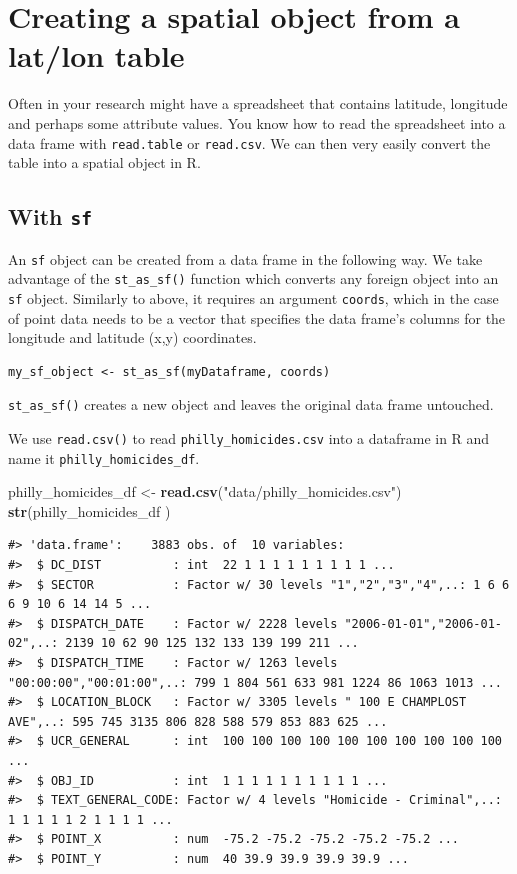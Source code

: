 \documentclass[]{book}
\newenvironment{Shaded}{\begin{snugshade}}{\end{snugshade}}
\newcommand{\KeywordTok}[1]{\textcolor[rgb]{0.13,0.29,0.53}{\textbf{#1}}}
\newcommand{\StringTok}[1]{\textcolor[rgb]{0.31,0.60,0.02}{#1}}
\newcommand{\NormalTok}[1]{#1}
\begin{document}
\section{Creating a spatial object from a lat/lon
table}\label{creating-a-spatial-object-from-a-latlon-table}

Often in your research might have a spreadsheet that contains latitude,
longitude and perhaps some attribute values. You know how to read the
spreadsheet into a data frame with \texttt{read.table} or
\texttt{read.csv}. We can then very easily convert the table into a
spatial object in R.

\subsection{\texorpdfstring{With \texttt{sf}}{With sf}}\label{with-sf}

An \texttt{sf} object can be created from a data frame in the following
way. We take advantage of the \texttt{st\_as\_sf()} function which
converts any foreign object into an \texttt{sf} object. Similarly to
above, it requires an argument \texttt{coords}, which in the case of
point data needs to be a vector that specifies the data frame's columns
for the longitude and latitude (x,y) coordinates.

\begin{verbatim}
my_sf_object <- st_as_sf(myDataframe, coords)
\end{verbatim}

\texttt{st\_as\_sf()} creates a new object and leaves the original data
frame untouched.

We use \texttt{read.csv()} to read \texttt{philly\_homicides.csv} into a
dataframe in R and name it \texttt{philly\_homicides\_df}.

\begin{Shaded}
\begin{Highlighting}[]
\NormalTok{philly_homicides_df <-}\StringTok{ }\KeywordTok{read.csv}\NormalTok{(}\StringTok{"data/philly_homicides.csv"}\NormalTok{)}
\KeywordTok{str}\NormalTok{(philly_homicides_df )}
\end{Highlighting}
\end{Shaded}

\begin{verbatim}
#> 'data.frame':    3883 obs. of  10 variables:
#>  $ DC_DIST          : int  22 1 1 1 1 1 1 1 1 1 ...
#>  $ SECTOR           : Factor w/ 30 levels "1","2","3","4",..: 1 6 6 6 9 10 6 14 14 5 ...
#>  $ DISPATCH_DATE    : Factor w/ 2228 levels "2006-01-01","2006-01-02",..: 2139 10 62 90 125 132 133 139 199 211 ...
#>  $ DISPATCH_TIME    : Factor w/ 1263 levels "00:00:00","00:01:00",..: 799 1 804 561 633 981 1224 86 1063 1013 ...
#>  $ LOCATION_BLOCK   : Factor w/ 3305 levels " 100 E CHAMPLOST AVE",..: 595 745 3135 806 828 588 579 853 883 625 ...
#>  $ UCR_GENERAL      : int  100 100 100 100 100 100 100 100 100 100 ...
#>  $ OBJ_ID           : int  1 1 1 1 1 1 1 1 1 1 ...
#>  $ TEXT_GENERAL_CODE: Factor w/ 4 levels "Homicide - Criminal",..: 1 1 1 1 1 2 1 1 1 1 ...
#>  $ POINT_X          : num  -75.2 -75.2 -75.2 -75.2 -75.2 ...
#>  $ POINT_Y          : num  40 39.9 39.9 39.9 39.9 ...
\end{verbatim}
\end{document}
